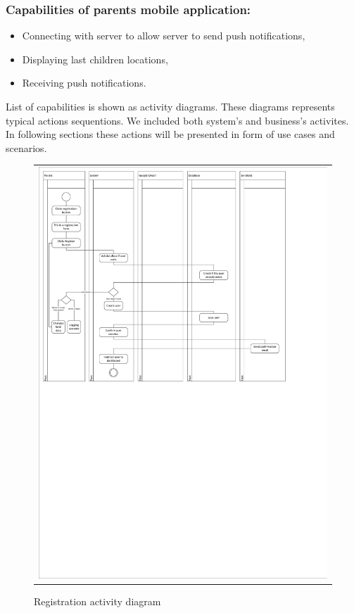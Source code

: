\documentclass{sprawozdanie-agh}
\begin{document}
			\subsubsection{Capabilities of parents mobile application:}

			\begin{itemize}
				\item Connecting with server to allow server to send push notifications,
				\item Displaying last children locations,
				\item Receiving push notifications.
			\end{itemize}



			List of capabilities is shown as activity diagrams. These diagrams represents typical actions sequentions. We included both system's and business's activites. In following sections these actions will be presented in form of use cases and scenarios. 

			\begin{figure}[H]
				\centering
				\begin{tabular}{c}
					\includegraphics[width=.95\textwidth]{cropped_Registration_Activity_Diagram} 
				\end{tabular}
			\caption{Registration activity diagram}
			\end{figure}
\end{document}
